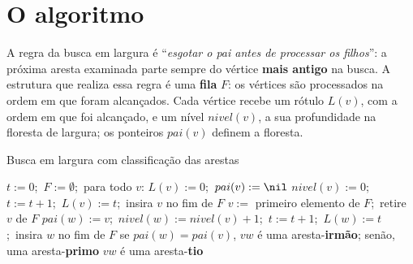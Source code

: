 \section{O algoritmo}\label{sec:bfsalg}
A regra da busca em largura é ``\emph{esgotar o pai antes de processar os filhos}'': a próxima aresta examinada parte sempre do vértice \textbf{mais antigo} na busca. A estrutura que realiza essa regra é uma \textbf{fila} $F$: os vértices são processados na ordem em que foram alcançados. Cada vértice recebe um rótulo $L(v)$, com a ordem em que foi alcançado, e um nível $nivel(v)$, a sua profundidade na floresta de largura; os ponteiros $pai(v)$ definem a floresta.
\begin{pseudo}{Busca em largura com classificação das arestas}
\begin{algorithmic}
  \State $t:=0$;\ $F:=\emptyset$;\ para todo $v$: $L(v):=0$;\ $pai(v):=\nil$
   
    \State $nivel(v):=0$;\ $t:=t+1$;\ $L(v):=t$;\ insira $v$ no fim de $F$
      \State $v:=$ primeiro elemento de $F$;\ retire $v$ de $F$
         
          \State $pai(w):=v$;\ $nivel(w):=nivel(v)+1$;\ $t:=t+1$;\ $L(w):=t$;\ insira $w$ no fim de $F$
         
          \State se $pai(w)=pai(v)$, $vw$ é uma aresta-\textbf{irmão}; senão, uma aresta-\textbf{primo}
         \State $vw$ é uma aresta-\textbf{tio}
        \EndIf
      \EndFor
    \EndWhile
  \EndWhile
\EndProcedure
\end{algorithmic}
\end{pseudo}

